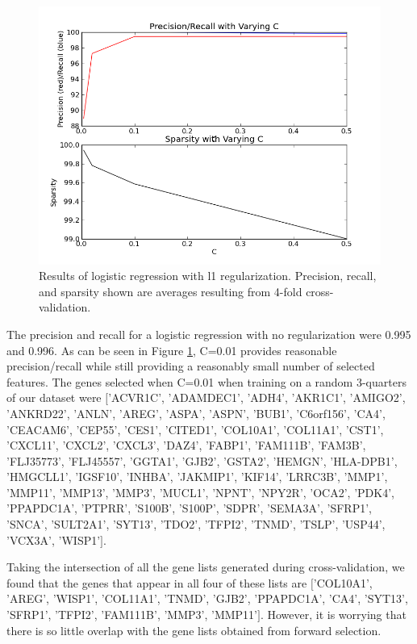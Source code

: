 \documentclass[11pt]{article}
\begin{document}
\begin{figure}[h!]
  \centering
    \includegraphics[scale=0.3]{sparselog.png}
  \caption{Results of logistic regression with l1 regularization. Precision, recall, and sparsity shown are averages resulting from 4-fold cross-validation.}
\label{fig:sparselog}
\end{figure}

The precision and recall for a logistic regression with no regularization were 0.995 and 0.996. As can be seen in Figure \ref{fig:sparselog}, C=0.01 provides reasonable precision/recall while still providing a reasonably small number of selected features. The genes selected when C=0.01 when training on a random 3-quarters of our dataset were $[$'ACVR1C', 'ADAMDEC1', 'ADH4', 'AKR1C1', 'AMIGO2', 'ANKRD22', 'ANLN', 'AREG', 'ASPA', 'ASPN', 'BUB1', 'C6orf156', 'CA4', 'CEACAM6', 'CEP55', 'CES1', 'CITED1', 'COL10A1', 'COL11A1', 'CST1', 'CXCL11', 'CXCL2', 'CXCL3', 'DAZ4', 'FABP1', 'FAM111B', 'FAM3B', 'FLJ35773', 'FLJ45557', 'GGTA1', 'GJB2', 'GSTA2', 'HEMGN', 'HLA-DPB1', 'HMGCLL1', 'IGSF10', 'INHBA', 'JAKMIP1', 'KIF14', 'LRRC3B', 'MMP1', 'MMP11', 'MMP13', 'MMP3', 'MUCL1', 'NPNT', 'NPY2R', 'OCA2', 'PDK4', 'PPAPDC1A', 'PTPRR', 'S100B', 'S100P', 'SDPR', 'SEMA3A', 'SFRP1', 'SNCA', 'SULT2A1', 'SYT13', 'TDO2', 'TFPI2', 'TNMD', 'TSLP', 'USP44', 'VCX3A', 'WISP1'$]$.

Taking the intersection of all the gene lists generated during cross-validation, we found that the genes that appear in all four of these lists are $[$'COL10A1', 'AREG', 'WISP1', 'COL11A1', 'TNMD', 'GJB2', 'PPAPDC1A', 'CA4', 'SYT13', 'SFRP1', 'TFPI2', 'FAM111B', 'MMP3', 'MMP11'$]$. However, it is worrying that there is so little overlap with the gene lists obtained from forward selection.
\end{document}
